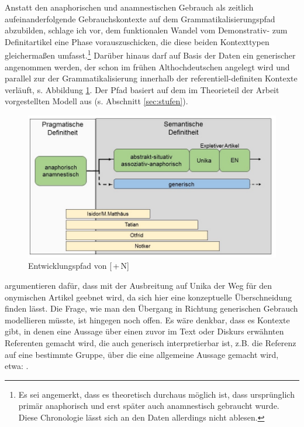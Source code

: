Anstatt den anaphorischen und anamnestischen Gebrauch als zeitlich aufeinanderfolgende Gebrauchskontexte  auf dem Grammatikalisierungspfad abzubilden, schlage ich vor, dem funktionalen Wandel vom Demonstrativ- zum Definitartikel eine Phase vorauszuschicken, die diese beiden Kontexttypen gleichermaßen umfasst.\footnote{Es sei angemerkt, dass es theoretisch durchaus möglich ist, dass  ursprünglich primär anaphorisch und erst später auch anamnestisch gebraucht wurde. Diese Chronologie lässt sich an den Daten allerdings nicht ablesen.} Darüber hinaus darf auf Basis der Daten ein generischer  angenommen werden, der schon im frühen Althochdeutschen angelegt wird und parallel zur  der Grammatikalisierung innerhalb der referentiell-definiten Kontexte verläuft, s. Abbildung \ref{abb:expansion-definitheit}. Der Pfad basiert auf dem im Theorieteil der Arbeit vorgestellten Modell aus \textcite{Schmuck2014} (s. Abschnitt \ref{sec:stufen}). 

 
\begin{figure}
\begin{center}
  \includegraphics[width=\textwidth]{images/diskussion-generisch-farbe-neu.jpg}
\caption {Entwicklungspfad von [\,+\,N]} 
\label{abb:expansion-definitheit}
\end{center}
\end{figure} 
 
\textcite[105]{Schmuck2014} argumentieren dafür, dass mit der Ausbreitung auf Unika der Weg für den onymischen Artikel geebnet wird, da sich hier eine konzeptuelle Überschneidung finden lässt. Die Frage, wie man den Übergang in Richtung generischen Gebrauch modellieren müsste, ist hingegen noch offen. Es wäre denkbar, dass es Kontexte gibt, in denen eine Aussage über einen zuvor im Text oder Diskurs erwähnten Referenten gemacht wird, die auch generisch interpretierbar ist, z.B. die Referenz auf eine bestimmte Gruppe, über die eine allgemeine Aussage gemacht wird, etwa: . 

